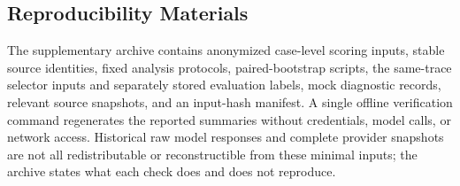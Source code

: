 \begin{revadded}
\section{Reproducibility Materials}
\label{app:reproducibility}
The supplementary archive contains anonymized case-level scoring inputs, stable source identities, fixed analysis protocols, paired-bootstrap scripts, the same-trace selector inputs and separately stored evaluation labels, mock diagnostic records, relevant source snapshots, and an input-hash manifest. A single offline verification command regenerates the reported summaries without credentials, model calls, or network access. Historical raw model responses and complete provider snapshots are not all redistributable or reconstructible from these minimal inputs; the archive states what each check does and does not reproduce.

\end{revadded}
